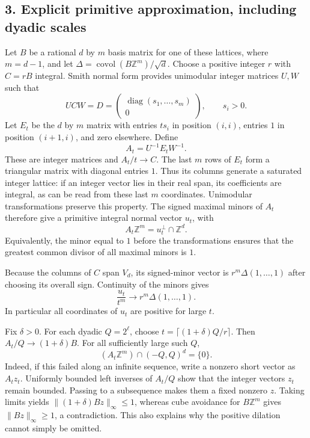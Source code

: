 \subsection{3. Explicit primitive approximation, including dyadic scales}
Let $B$ be a rational $d$ by $m$ basis matrix for one of these lattices,
where $m=d-1$, and let $\Delta=\operatorname{covol}(B\mathbb Z^m)/\sqrt d$.
Choose a positive integer $r$ with $C=rB$ integral. Smith normal form
provides unimodular integer matrices $U,W$ such that
\[
 UCW=D=\begin{pmatrix}\operatorname{diag}(s_1,\ldots,s_m)\\0\end{pmatrix},
 \qquad s_i>0.
\]
Let $E_t$ be the $d$ by $m$ matrix with entries $t s_i$ in position
$(i,i)$, entries $1$ in position $(i+1,i)$, and zero elsewhere.
Define
\[
 A_t=U^{-1}E_tW^{-1}.
\]
These are integer matrices and $A_t/t\to C$. The last $m$ rows of
$E_t$ form a triangular matrix with diagonal entries $1$. Thus its
columns generate a saturated integer lattice: if an integer vector
lies in their real span, its coefficients are integral, as can be
read from these last $m$ coordinates. Unimodular transformations
preserve this property. The signed maximal minors of $A_t$ therefore
give a primitive integral normal vector $u_t$, with
\[
 A_t\mathbb Z^m=u_t^\perp\cap\mathbb Z^d.             \tag{5}
\]
Equivalently, the minor equal to $1$ before the transformations ensures
that the greatest common divisor of all maximal minors is $1$.

Because the columns of $C$ span $V_d$, its signed-minor vector is
$r^m\Delta(1,\ldots,1)$ after choosing its overall sign. Continuity
of the minors gives
\[
 \frac{u_t}{t^m}\longrightarrow r^m\Delta(1,\ldots,1). \tag{6}
\]
In particular all coordinates of $u_t$ are positive for large $t$.

Fix $\delta>0$. For each dyadic $Q=2^\ell$, choose
$t=\lceil(1+\delta)Q/r\rceil$. Then $A_t/Q\to(1+\delta)B$.
For all sufficiently large such $Q$,
\[
 (A_t\mathbb Z^m)\cap(-Q,Q)^d=\{0\}.                 \tag{7}
\]
Indeed, if this failed along an infinite sequence, write a nonzero
short vector as $A_t z_t$. Uniformly bounded left inverses of $A_t/Q$
show that the integer vectors $z_t$ remain bounded. Passing to a
subsequence makes them a fixed nonzero $z$. Taking limits yields
$\|(1+\delta)Bz\|_\infty\leq1$, whereas cube avoidance for $B\mathbb
Z^m$ gives $\|Bz\|_\infty\geq1$, a contradiction. This also explains
why the positive dilation cannot simply be omitted.

